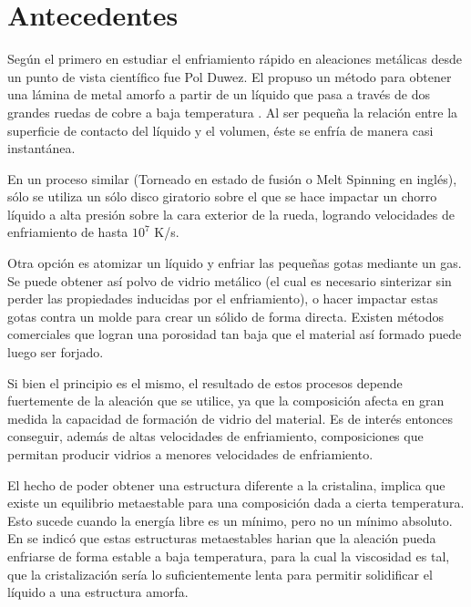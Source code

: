 
\section{Antecedentes}
\label{S1_2}

Según \cite{liebermann93} el primero en estudiar el enfriamiento rápido en aleaciones metálicas desde un punto de vista científico fue Pol Duwez. El propuso un método para obtener una lámina de metal amorfo a partir de un líquido que pasa a través de dos grandes ruedas de cobre a baja temperatura \citep{duwez60}. Al ser pequeña la relación entre la superficie de contacto del líquido y el volumen, éste se enfría de manera casi instantánea.

En un proceso similar (Torneado en estado de fusión o Melt Spinning en inglés), sólo se utiliza un sólo disco giratorio sobre el que se hace impactar un chorro líquido a alta presión sobre la cara exterior de la rueda, logrando velocidades de enfriamiento de hasta $10^{7}$ K/s.

Otra opción es atomizar un líquido y enfriar las pequeñas gotas mediante un gas. Se puede obtener así polvo de vidrio metálico (el cual es necesario sinterizar sin perder las propiedades inducidas por el enfriamiento), o hacer impactar estas gotas contra un molde para crear un sólido de forma directa. Existen métodos comerciales que logran una porosidad tan baja que el material así formado puede luego ser forjado.

Si bien el principio es el mismo, el resultado de estos procesos depende fuertemente de la aleación que se utilice, ya que la composición afecta en gran medida la capacidad de formación de vidrio del material. Es de interés entonces conseguir, además de altas velocidades de enfriamiento, composiciones que permitan producir vidrios a menores velocidades de enfriamiento.

El hecho de poder obtener una estructura diferente a la cristalina, implica que existe un equilibrio metaestable para una composición dada a cierta temperatura. Esto sucede cuando la energía libre es un mínimo, pero no un mínimo absoluto. En \cite{cohen61} se indicó que estas estructuras metaestables harian que la aleación pueda enfriarse de forma estable a baja temperatura, para la cual la viscosidad es tal, que la cristalización sería lo suficientemente lenta para permitir solidificar el líquido a una estructura amorfa.

